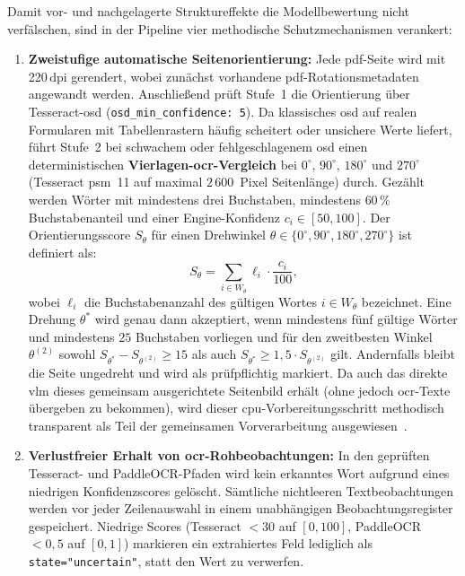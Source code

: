 Damit vor- und nachgelagerte Struktureffekte die Modellbewertung nicht verfälschen, sind in der Pipeline vier methodische Schutzmechanismen verankert:

\begin{enumerate}
  \item \textbf{Zweistufige automatische Seitenorientierung:} Jede \ac{pdf}-Seite wird mit \mbox{220\,\ac{dpi}} gerendert, wobei zunächst vorhandene \ac{pdf}-Rotationsmetadaten angewandt werden. Anschließend prüft Stufe~1 die Orientierung über Tesseract-\ac{osd} (\texttt{osd\_min\_confidence: 5}). Da klassisches \ac{osd} auf realen Formularen mit Tabellenrastern häufig scheitert oder unsichere Werte liefert, führt Stufe~2 bei schwachem oder fehlgeschlagenem \ac{osd} einen deterministischen \textbf{Vierlagen-\ac{ocr}-Vergleich} bei $0^\circ$, $90^\circ$, $180^\circ$ und $270^\circ$ (Tesseract \ac{psm}~11 auf maximal $2\,600$~Pixel Seitenlänge) durch. Gezählt werden Wörter mit mindestens drei Buchstaben, mindestens $60\,\%$ Buchstabenanteil und einer Engine-Konfidenz $c_i \in [50, 100]$. Der Orientierungsscore $S_\theta$ für einen Drehwinkel $\theta \in \{0^\circ, 90^\circ, 180^\circ, 270^\circ\}$ ist definiert als:
  \begin{equation}
    S_\theta = \sum_{i \in W_\theta} \ell_i \cdot \frac{c_i}{100},
    \label{eq:orientation-score}
  \end{equation}
  wobei $\ell_i$ die Buchstabenanzahl des gültigen Wortes $i \in W_\theta$ bezeichnet. Eine Drehung $\theta^*$ wird genau dann akzeptiert, wenn mindestens fünf gültige Wörter und mindestens $25$ Buchstaben vorliegen und für den zweitbesten Winkel $\theta^{(2)}$ sowohl $S_{\theta^*} - S_{\theta^{(2)}} \ge 15$ als auch $S_{\theta^*} \ge 1{,}5 \cdot S_{\theta^{(2)}}$ gilt. Andernfalls bleibt die Seite ungedreht und wird als prüfpflichtig markiert. Da auch das direkte \ac{vlm} dieses gemeinsam ausgerichtete Seitenbild erhält (ohne jedoch \ac{ocr}-Texte übergeben zu bekommen), wird dieser \ac{cpu}-Vorbereitungsschritt methodisch transparent als Teil der gemeinsamen Vorverarbeitung ausgewiesen~\cite{Smith2007Tesseract}.
  \item \textbf{Verlustfreier Erhalt von \ac{ocr}-Rohbeobachtungen:} In den geprüften Tesseract- und PaddleOCR-Pfaden wird kein erkanntes Wort aufgrund eines niedrigen Konfidenzscores gelöscht. Sämtliche nichtleeren Textbeobachtungen werden vor jeder Zeilenauswahl in einem unabhängigen Beobachtungsregister gespeichert. Niedrige Scores (Tesseract $< 30$ auf $[0, 100]$, PaddleOCR $< 0{,}5$ auf $[0, 1]$) markieren ein extrahiertes Feld lediglich als \texttt{state="uncertain"}, statt den Wert zu verwerfen.

\end{enumerate}
